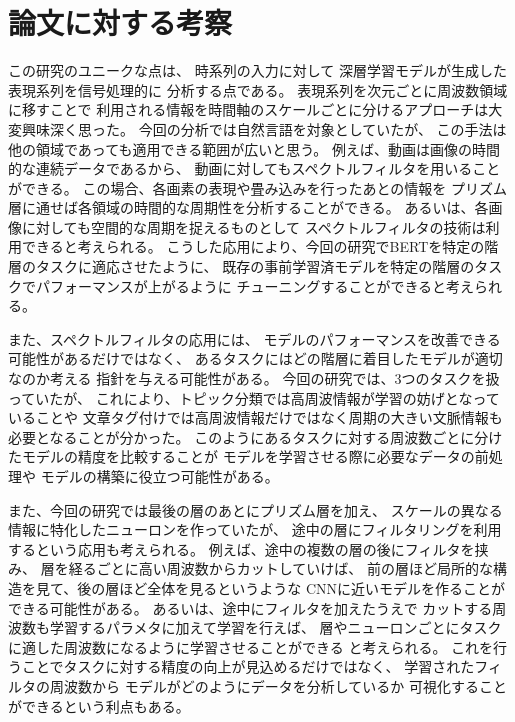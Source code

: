 \documentclass{jsarticle}
\begin{document}
\section{論文に対する考察}
この研究のユニークな点は、
時系列の入力に対して
深層学習モデルが生成した表現系列を信号処理的に
分析する点である。
表現系列を次元ごとに周波数領域に移すことで
利用される情報を時間軸のスケールごとに分けるアプローチは大変興味深く思った。
今回の分析では自然言語を対象としていたが、
この手法は他の領域であっても適用できる範囲が広いと思う。
例えば、動画は画像の時間的な連続データであるから、
動画に対してもスペクトルフィルタを用いることができる。
この場合、各画素の表現や畳み込みを行ったあとの情報を
プリズム層に通せば各領域の時間的な周期性を分析することができる。
あるいは、各画像に対しても空間的な周期を捉えるものとして
スペクトルフィルタの技術は利用できると考えられる。
こうした応用により、今回の研究でBERTを特定の階層のタスクに適応させたように、
既存の事前学習済モデルを特定の階層のタスクでパフォーマンスが上がるように
チューニングすることができると考えられる。

また、スペクトルフィルタの応用には、
モデルのパフォーマンスを改善できる可能性があるだけではなく、
あるタスクにはどの階層に着目したモデルが適切なのか考える
指針を与える可能性がある。
今回の研究では、3つのタスクを扱っていたが、
これにより、トピック分類では高周波情報が学習の妨げとなっていることや
文章タグ付けでは高周波情報だけではなく周期の大きい文脈情報も
必要となることが分かった。
このようにあるタスクに対する周波数ごとに分けたモデルの精度を比較することが
モデルを学習させる際に必要なデータの前処理や
モデルの構築に役立つ可能性がある。

また、今回の研究では最後の層のあとにプリズム層を加え、
スケールの異なる情報に特化したニューロンを作っていたが、
途中の層にフィルタリングを利用するという応用も考えられる。
例えば、途中の複数の層の後にフィルタを挟み、
層を経るごとに高い周波数からカットしていけば、
前の層ほど局所的な構造を見て、後の層ほど全体を見るというような
CNNに近いモデルを作ることができる可能性がある。
あるいは、途中にフィルタを加えたうえで
カットする周波数も学習するパラメタに加えて学習を行えば、
層やニューロンごとにタスクに適した周波数になるように学習させることができる
と考えられる。
これを行うことでタスクに対する精度の向上が見込めるだけではなく、
学習されたフィルタの周波数から
モデルがどのようにデータを分析しているか
可視化することができるという利点もある。
\end{document}
